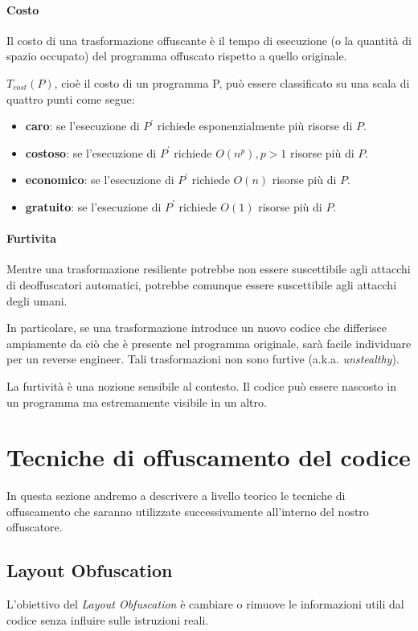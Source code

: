 \documentclass[a4paper,oneside,openright,titlepage,10pt,footinclude,headinclude]{scrbook}
\begin{document}
\paragraph{Costo}
Il costo di una trasformazione offuscante è il tempo di esecuzione (o la quantità di spazio occupato) del programma offuscato rispetto a quello originale.\smallskip

\noindent $T_{cost}(P)$, cioè il costo di un programma P, può essere classificato su una scala di quattro punti come segue:
\begin{itemize}
\item
\textbf{caro}: se l'esecuzione di $P^{'}$ richiede esponenzialmente più risorse di $P$.
 \item
\textbf{costoso}: se l'esecuzione di $P^{'}$ richiede $O(n^{p}), p>1$ risorse più di $P$.
 \item
\textbf{economico}: se l'esecuzione di $P^{'}$ richiede $O(n)$ risorse più di $P$.
 \item
\textbf{gratuito}: se l'esecuzione di $P^{'}$ richiede $O(1)$ risorse più di $P$.
\end{itemize}


 \paragraph{Furtivita}
 Mentre una trasformazione resiliente potrebbe non essere suscettibile agli attacchi di deoffuscatori automatici, potrebbe comunque essere suscettibile agli attacchi degli umani.
 
In particolare, se una trasformazione introduce un nuovo codice che differisce ampiamente da ciò che è presente nel programma originale, sarà facile individuare per un reverse engineer. Tali trasformazioni non sono furtive (a.k.a. \emph{unstealthy}).

La furtività è una nozione sensibile al contesto. Il codice può essere nascosto in un programma ma estremamente visibile in un altro.\\

\section{Tecniche di offuscamento del codice}
In questa sezione andremo a descrivere a livello teorico le tecniche di offuscamento che saranno utilizzate successivamente all'interno del nostro offuscatore.

\subsection{Layout Obfuscation}
L'obiettivo del \emph{Layout Obfuscation} è cambiare o rimuove le informazioni utili dal codice senza influire sulle istruzioni reali.\medskip
\end{document}
